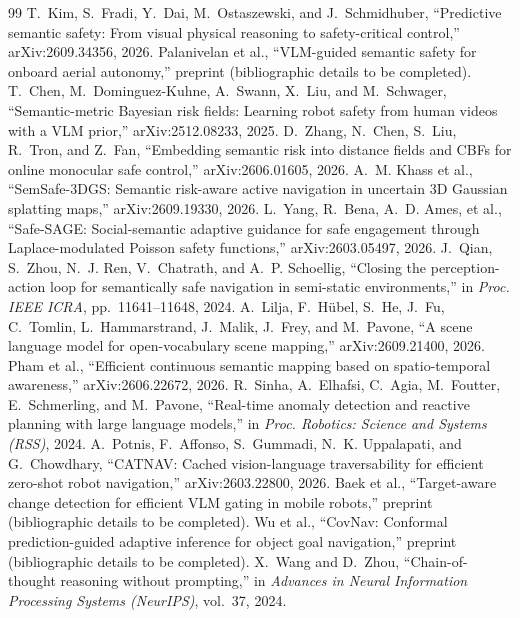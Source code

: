 \documentclass[10pt,a4paper]{article}
\begin{document}
\begin{thebibliography}{99}
 T.~Kim, S.~Fradi, Y.~Dai, M.~Ostaszewski, and J.~Schmidhuber, ``Predictive semantic safety: From visual physical reasoning to safety-critical control,'' arXiv:2609.34356, 2026.
 Palanivelan et al., ``VLM-guided semantic safety for onboard aerial autonomy,'' preprint (bibliographic details to be completed).
 T.~Chen, M.~Dominguez-Kuhne, A.~Swann, X.~Liu, and M.~Schwager, ``Semantic-metric Bayesian risk fields: Learning robot safety from human videos with a VLM prior,'' arXiv:2512.08233, 2025.
 D.~Zhang, N.~Chen, S.~Liu, R.~Tron, and Z.~Fan, ``Embedding semantic risk into distance fields and CBFs for online monocular safe control,'' arXiv:2606.01605, 2026.
 A.~M. Khass et al., ``SemSafe-3DGS: Semantic risk-aware active navigation in uncertain 3D Gaussian splatting maps,'' arXiv:2609.19330, 2026.
 L.~Yang, R.~Bena, A.~D. Ames, et al., ``Safe-SAGE: Social-semantic adaptive guidance for safe engagement through Laplace-modulated Poisson safety functions,'' arXiv:2603.05497, 2026.
 J.~Qian, S.~Zhou, N.~J. Ren, V.~Chatrath, and A.~P. Schoellig, ``Closing the perception-action loop for semantically safe navigation in semi-static environments,'' in \emph{Proc. IEEE ICRA}, pp.~11641--11648, 2024.
 A.~Lilja, F.~H\"ubel, S.~He, J.~Fu, C.~Tomlin, L.~Hammarstrand, J.~Malik, J.~Frey, and M.~Pavone, ``A scene language model for open-vocabulary scene mapping,'' arXiv:2609.21400, 2026.
 Pham et al., ``Efficient continuous semantic mapping based on spatio-temporal awareness,'' arXiv:2606.22672, 2026.
 R.~Sinha, A.~Elhafsi, C.~Agia, M.~Foutter, E.~Schmerling, and M.~Pavone, ``Real-time anomaly detection and reactive planning with large language models,'' in \emph{Proc. Robotics: Science and Systems (RSS)}, 2024.
 A.~Potnis, F.~Affonso, S.~Gummadi, N.~K. Uppalapati, and G.~Chowdhary, ``CATNAV: Cached vision-language traversability for efficient zero-shot robot navigation,'' arXiv:2603.22800, 2026.
 Baek et al., ``Target-aware change detection for efficient VLM gating in mobile robots,'' preprint (bibliographic details to be completed).
 Wu et al., ``CovNav: Conformal prediction-guided adaptive inference for object goal navigation,'' preprint (bibliographic details to be completed).
 X.~Wang and D.~Zhou, ``Chain-of-thought reasoning without prompting,'' in \emph{Advances in Neural Information Processing Systems (NeurIPS)}, vol.~37, 2024.

\end{thebibliography}
\end{document}
